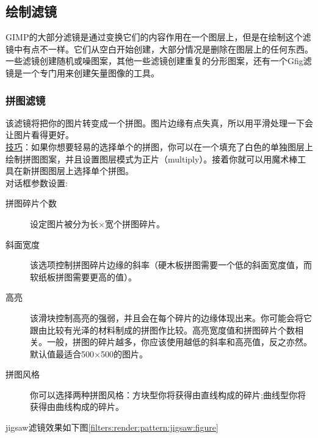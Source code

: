\subsection{绘制滤镜}
GIMP的大部分滤镜是通过变换它们的内容作用在一个图层上，但是在绘制这个滤镜中有点不一样。它们从空白开始创建，大部分情况是删除在图层上的任何东西。一些滤镜创建随机或噪图案，其他一些滤镜创建重复的分形图案，还有一个Gfig滤镜是一个专门用来创建矢量图像的工具。

\subsubsection{拼图滤镜}\label{filters:render:pattern:jigsaw}
该滤镜将把你的图片转变成一个拼图。图片边缘有点失真，所以用平滑处理一下会让图片看得更好。\\
\underline{技巧}：如果你想要轻易的选择单个的拼图，你可以在一个填充了白色的单独图层上绘制拼图图案，并且设置图层模式为正片（multiply）。接着你就可以用魔术棒工具在新拼图图层上选择单个拼图。\\
对话框参数设置:
\begin{description}
\item[拼图碎片个数]	设定图片被分为长×宽个拼图碎片。
\item[斜面宽度]	该选项控制拼图碎片边缘的斜率（硬木板拼图需要一个低的斜面宽度值，而软纸板拼图需要更高的值）。
\item[高亮]	该滑块控制高亮的强弱，并且会在每个碎片的边缘体现出来。你可能会将它跟由比较有光泽的材料制成的拼图作比较。高亮宽度值和拼图碎片个数相关。一般，拼图的碎片越多，你应该使用越低的斜率和高亮值，反之亦然。默认值最适合500×500的图片。
\item[拼图风格]	你可以选择两种拼图风格：方块型你将获得由直线构成的碎片;曲线型你将获得由曲线构成的碎片。
\end{description}
jigsaw滤镜效果如下图\ref{filters:render:pattern:jigsaw:figure}
